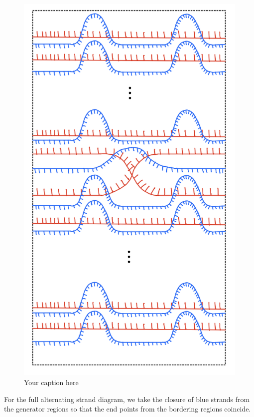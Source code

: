 \begin{figure}[H] %
    \centering
    \includegraphics[scale = 0.95]{diagrams/natural_alternating_diagrams/9.png} %
    \caption{Your caption here}
    \label{fig:your-label}
\end{figure}

For the full alternating strand diagram, we take the closure of blue strands from the generator regions so that the end points from the bordering regions coincide.


